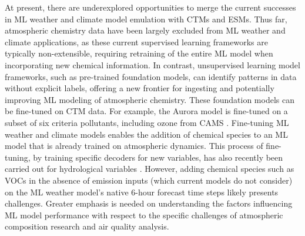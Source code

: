 \documentclass[gmd, manuscript]{copernicus}
\begin{document}
At present, there are underexplored opportunities to merge the current successes in ML weather and climate model emulation with CTMs and ESMs. Thus far, atmospheric chemistry data have been largely excluded from ML weather and climate applications, as these current supervised learning frameworks are typically non-extensible, requiring retraining of the entire ML model when incorporating new chemical information. In contrast, unsupervised learning model frameworks, such as pre-trained foundation models, can identify patterns in data without explicit labels, offering a new frontier for ingesting and potentially improving ML modeling of atmospheric chemistry. These foundation models can be fine-tuned on CTM data. For example, the Aurora model \citep{Bodnar2024} is fine-tuned on a subset of six criteria pollutants, including ozone from CAMS \citep{inness_cams_2019}. Fine-tuning ML weather and climate models enables the addition of chemical species to an ML model that is already trained on atmospheric dynamics. This process of fine-tuning, by training specific decoders for new variables, has also recently been carried out for hydrological variables \citep{lehmann2025finetuningweatherfoundationmodel}. However, adding chemical species such as VOCs in the absence of emission inputs (which current models do not consider) on the ML weather model's native 6-hour forecast time steps likely presents challenges. Greater emphasis is needed on understanding the factors influencing ML model performance with respect to the specific challenges of atmospheric composition research and air quality analysis.

\end{document}
